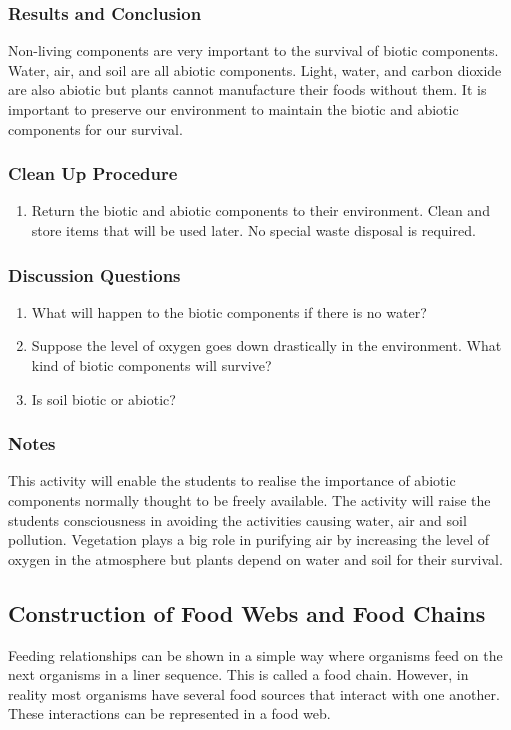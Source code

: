 \subsubsection*{Results and Conclusion}
Non-living components are very important to the survival of biotic components. Water, air, and soil are all abiotic components. Light, water, and carbon dioxide are also abiotic but plants cannot manufacture their foods without them. It is important to preserve our environment to maintain the biotic and abiotic components for our survival.

\subsubsection*{Clean Up Procedure}
\begin{enumerate}
\item{Return the biotic and abiotic components to their environment. Clean and store items that will be used later. No special waste disposal is required.}
\end{enumerate}

\subsubsection*{Discussion Questions}
\begin{enumerate}
\item{What will happen to the biotic components if there is no water?}
\item{Suppose the level of oxygen goes down drastically in the environment. What kind of biotic components will survive?}
\item{Is soil biotic or abiotic?}
\end{enumerate}

\subsubsection*{Notes}
This activity will enable the students to realise the importance of abiotic components normally thought to be freely available. The activity will raise the students consciousness in avoiding the activities causing water, air and soil pollution. Vegetation plays a big role in purifying air by increasing the level of oxygen in the atmosphere but plants depend on water and soil for their survival.

\subsection{Construction of Food Webs and Food Chains}
Feeding relationships can be shown in a simple way where organisms feed on the next organisms in a liner sequence. This is called a food chain. However, in reality most organisms have several food sources that interact with one another. These interactions can be represented in a food web.

